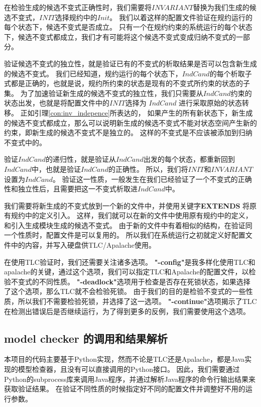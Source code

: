 在检验生成的候选不变式正确性时，我们需要将$INVARIANT$替换为我们生成的候选不变式，$INIT$选择规约中的$Init$。
我们以着这样的配置文件验证在规约运行的每个状态下，候选不变式是否成立。
只有一个在规约约束的系统运行的每个状态下，候选不变式都成立，我们才有可能将这个候选不变式变成归纳不变式的一部分。

验证候选不变式的独立性，就是验证已有的不变式的析取结果是否可以包含新生成的候选不变式。
我们已经知道，规约运行的每个状态下，$IndCand$的每个析取子式都是正确的，也就是说，规约所约束的状态是现有的不变式所约束的状态的子集。
为了加速验证新生成的候选不变式的独立性，我们只需要从$IndCand$约束的状态出发，也就是将配置文件中的$INIT$选择为 $IndCand$ 进行采取原始的状态转移。
正如引理\ref{con:inv_indepence}所表达的，
如果产生的所有新状态下，新生成的候选不变式都成立，那么可以说明新生成的候选不变式不能对状态空间产生新的约束，即新生成的候选不变式不是独立的。
这样的不变式是不应该被添加到归纳不变式中的。

验证$IndCand$的递归性，就是验证从$IndCand$出发的每个状态，都重新回到$IndCand$中，也就是验证$IndCand$的正确性。
所以，我们将$INIT$和$INVARIANT$设置为$IndCand$。
验证这一性质，一般发生在我们已经验证了一个不变式的正确性和独立性后，且需要把这一不变式析取进$IndCand$中。

我们需要将新生成的不变式放到一个新的文件中，并使用关键字\textbf{EXTENDS} 将原有规约中的定义引入。
这样，我们就可以在新的文件中使用原有规约中的定义，和引入生成模块生成的候选不变式。
由于新的\TLA 文件中有着相似的结构，在验证同一个性质时，配置文件是可以复用的。
所以我们在系统运行之初就定义好配置文件中的内容，并写入硬盘供TLC/Apalache使用。

在使用TLC验证时，我们还需要关注诸多选项。
\textbf{"-config"}是我多样化使用TLC和apalache的关键，通过这个选项，我们可以指定TLC和Apalache的配置文件，以检验不变式的不同性质。
\textbf{"-deadlock"}选项用于检查是否存在死锁状态，如果选择了这个选项，那么TLC就不会检验死锁。
由于我们的目的是检验不变式的一些性质，所以我们不需要检验死锁，并选择了这一选项。
\textbf{"-continue"}选项揭示了TLC在检测出错误后是否继续运行，为了得到更多的反例，我们需要使用这个选项。

\subsection{model checker 的调用和结果解析}
本项目的代码主要基于Python实现，然而不论是TLC还是Apalache，都是Java实现的模型检查器，且没有可以直接调用的Python接口。
因此，我们需要通过Python的subprocess库来调用Java程序，并通过解析Java程序的命令行输出结果来获取验证结果。
在验证不同性质的时候指定好不同的配置文件并调整好不用的运行参数。

